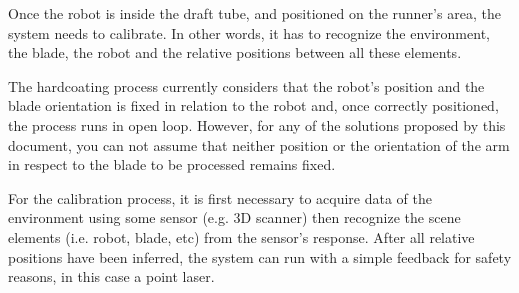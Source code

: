 
Once the robot is inside the draft tube, and positioned on the runner's area,
the system needs to calibrate. In other words, it has to recognize the
environment, the blade, the robot and the relative positions between all these
elements. %

The hardcoating process currently considers that the robot's position and the
blade orientation is fixed in relation to the robot and, once correctly positioned,
the process runs in open loop. However, for any of the solutions proposed
by this document, you can not assume that neither position or the orientation
of the arm in respect to the blade to be processed remains fixed. %

For the calibration process, it is first necessary to acquire data
of the environment using some sensor (e.g. 3D scanner) then recognize the scene
elements (i.e. robot, blade, etc) from the sensor's response. After all relative
positions have been inferred, the system can run with a simple feedback for
safety reasons, in this case a point laser.

% 
